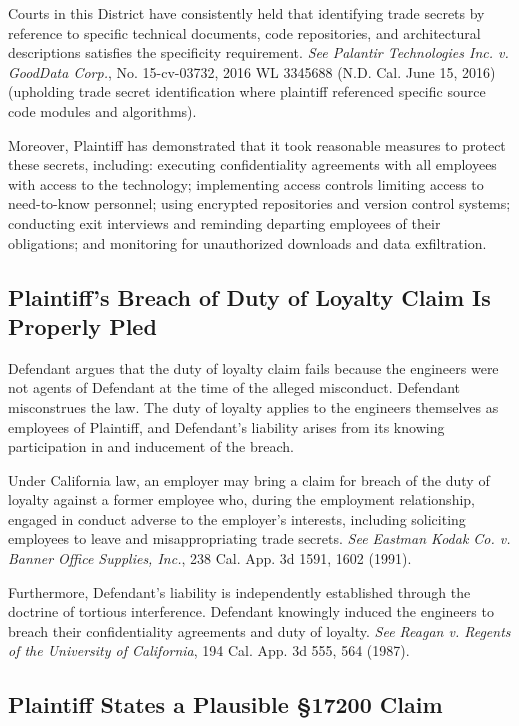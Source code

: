 \documentclass[
    language=english,
    doctype=legal-brief,
    institution=none,
]{../../omnilatex}
\begin{document}
Courts in this District have consistently held that identifying trade secrets by reference to specific technical documents, code repositories, and architectural descriptions satisfies the specificity requirement. \textit{See Palantir Technologies Inc. v. GoodData Corp.}, No. 15-cv-03732, 2016 WL 3345688 (N.D. Cal. June 15, 2016) (upholding trade secret identification where plaintiff referenced specific source code modules and algorithms).

Moreover, Plaintiff has demonstrated that it took reasonable measures to protect these secrets, including: executing confidentiality agreements with all employees with access to the technology; implementing access controls limiting access to need-to-know personnel; using encrypted repositories and version control systems; conducting exit interviews and reminding departing employees of their obligations; and monitoring for unauthorized downloads and data exfiltration.

\subsection{Plaintiff's Breach of Duty of Loyalty Claim Is Properly Pled}

Defendant argues that the duty of loyalty claim fails because the engineers were not agents of Defendant at the time of the alleged misconduct. Defendant misconstrues the law. The duty of loyalty applies to the engineers themselves as employees of Plaintiff, and Defendant's liability arises from its knowing participation in and inducement of the breach.

Under California law, an employer may bring a claim for breach of the duty of loyalty against a former employee who, during the employment relationship, engaged in conduct adverse to the employer's interests, including soliciting employees to leave and misappropriating trade secrets. \textit{See Eastman Kodak Co. v. Banner Office Supplies, Inc.}, 238 Cal. App. 3d 1591, 1602 (1991).

Furthermore, Defendant's liability is independently established through the doctrine of tortious interference. Defendant knowingly induced the engineers to breach their confidentiality agreements and duty of loyalty. \textit{See Reagan v. Regents of the University of California}, 194 Cal. App. 3d 555, 564 (1987).

\subsection{Plaintiff States a Plausible \S 17200 Claim}
\end{document}
